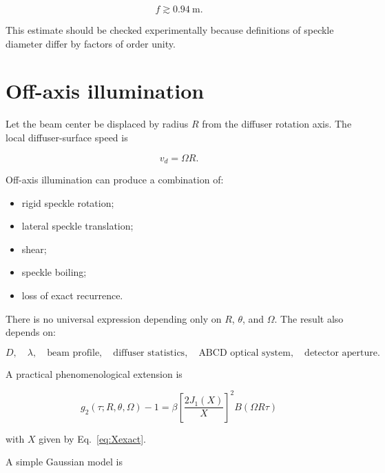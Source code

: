 \documentclass[11pt]{article}
\begin{document}
\begin{equation}
    f
    \gtrsim
    \SI{0.94}{\meter}.
\end{equation}

This estimate should be checked experimentally because definitions of speckle
diameter differ by factors of order unity.

\section{Off-axis illumination}

Let the beam center be displaced by radius $R$ from the diffuser rotation
axis. The local diffuser-surface speed is

\begin{equation}
    v_d=\Omega R.
\end{equation}

Off-axis illumination can produce a combination of:

\begin{itemize}
    \item rigid speckle rotation;
    \item lateral speckle translation;
    \item shear;
    \item speckle boiling;
    \item loss of exact recurrence.
\end{itemize}

There is no universal expression depending only on
$R$, $\theta$, and $\Omega$. The result also depends on:

\begin{equation}
    D,\quad
    \lambda,\quad
    \text{beam profile},\quad
    \text{diffuser statistics},\quad
    \text{ABCD optical system},\quad
    \text{detector aperture}.
\end{equation}

A practical phenomenological extension is

\begin{equation}
\boxed{
    g_2(\tau;R,\theta,\Omega)-1
    =
    \beta
    \left[
        \frac{2J_1(X)}{X}
    \right]^2
    B(\Omega R\tau)
}
\label{eq:offaxis_general}
\end{equation}

with $X$ given by Eq.~\eqref{eq:Xexact}.

A simple Gaussian model is
\end{document}
